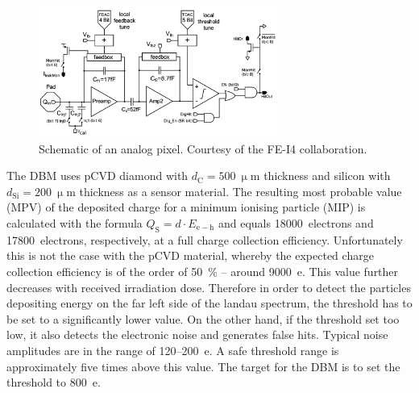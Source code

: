 \begin{figure}[!t]
\centering
\includegraphics[width=0.7\textwidth]{04_charge_monitoring/pics/analogPix}
\caption{Schematic of an analog pixel. Courtesy of the FE-I4 collaboration.}
\label{fig:anapix}
\end{figure}

The DBM uses pCVD diamond with $d_\mathrm{C}=500~\upmu$m thickness and silicon with $d_\mathrm{Si}=200~\upmu$m thickness as a sensor material. The resulting most probable value (MPV) of the deposited charge for a minimum ionising particle (MIP) is calculated with the formula $Q_\mathrm{S}=d \cdot E_\mathrm{e-h}$ and equals 18000~electrons and 17800~electrons, respectively, at a full charge collection efficiency. Unfortunately this is not the case with the pCVD material, whereby the expected charge collection efficiency is of the order of 50~\%  -- around 9000~e. This value further decreases with received irradiation dose. Therefore in order to detect the particles depositing energy on the far left side of the landau spectrum, the threshold has to be set to a significantly lower value. On the other hand, if the threshold set too low, it also detects the electronic noise and generates false hits. Typical noise amplitudes are in the range of 120--200~e. A safe threshold range is approximately five times above this value. The target for the DBM is to set the threshold to 800~e.

